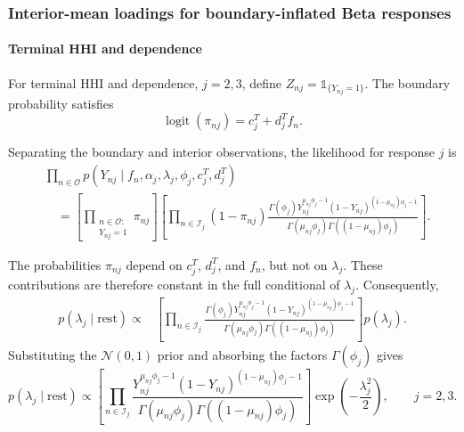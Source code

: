 \documentclass[pdftex,12pt,openright,a4paper,oneside]{book}
\begin{document}
\subsubsection{Interior-mean loadings for boundary-inflated Beta responses}

\paragraph{Terminal HHI and dependence}

For terminal HHI and dependence, $j=2,3$, define
$Z_{nj}=\mathds{1}_{\{Y_{nj}=1\}}$. 
The boundary probability satisfies
\begin{equation*}
\operatorname{logit}(\pi_{nj})
=
c_j^T+d_j^Tf_n.
\end{equation*}

Separating the boundary and interior observations,
the likelihood for response $j$ is
\begin{equation*}
\begin{aligned}
&\prod_{n\in\mathcal{O}}
p(Y_{nj}\mid f_n,\alpha_j,\lambda_j,
\phi_j,c_j^T,d_j^T)
\\
&\quad=
\left[
\prod_{\substack{n\in\mathcal{O}:\\Y_{nj}=1}}
\pi_{nj}
\right]
\left[
\prod_{n\in\mathcal{I}_j}
(1-\pi_{nj})
\frac{
\Gamma(\phi_j)
Y_{nj}^{\mu_{nj}\phi_j-1}
(1-Y_{nj})^{(1-\mu_{nj})\phi_j-1}
}{
\Gamma(\mu_{nj}\phi_j)
\Gamma((1-\mu_{nj})\phi_j)
}
\right].
\end{aligned}
\end{equation*}

The probabilities $\pi_{nj}$ depend on $c_j^T$,
$d_j^T$, and $f_n$, but not on $\lambda_j$.
These contributions are therefore constant in
the full conditional of $\lambda_j$. Consequently,
\begin{equation*}
\begin{aligned}
p(\lambda_j\mid\mathrm{rest})
\propto {}&
\left[
\prod_{n\in\mathcal{I}_j}
\frac{
\Gamma(\phi_j)
Y_{nj}^{\mu_{nj}\phi_j-1}
(1-Y_{nj})^{(1-\mu_{nj})\phi_j-1}
}{
\Gamma(\mu_{nj}\phi_j)
\Gamma((1-\mu_{nj})\phi_j)
}
\right]
p(\lambda_j).
\end{aligned}
\end{equation*}
Substituting the $\mathcal{N}(0,1)$ prior and
absorbing the factors $\Gamma(\phi_j)$ gives
\begin{equation*}
p(\lambda_j\mid\mathrm{rest})
\propto 
\left[
\prod_{n\in\mathcal{I}_j}
\frac{
Y_{nj}^{\mu_{nj}\phi_j-1}
(1-Y_{nj})^{(1-\mu_{nj})\phi_j-1}
}{
\Gamma(\mu_{nj}\phi_j)
\Gamma((1-\mu_{nj})\phi_j)
}
\right]
\exp\!\left(-\frac{\lambda_j^2}{2}\right),
\qquad j=2,3.
\end{equation*}
\end{document}
